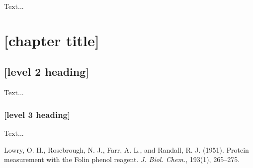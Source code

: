 \documentclass[12pt,a4paper]{report}
\begin{document}

Text...


\chapter{[chapter title]}

\section{[level 2 heading]}

Text...

\subsection{[level 3 heading]}

Text...


\renewcommand{\bibname}{REFERENCES}





\begin{thebibliography}{10}


Lowry, O. H., Rosebrough, N. J., Farr, A. L., and Randall, R. J. (1951). Protein measurement with the Folin phenol reagent. \emph{J. Biol. Chem.}, 193(1), 265--275.

\end{thebibliography}
\end{document}
